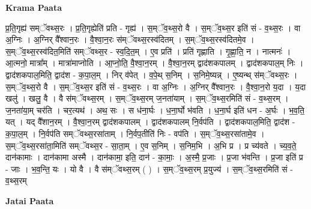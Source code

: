 \documentclass[17pt]{extarticle}
\begin{document}
\textbf{Krama Paata} \newline

प्र॒ति॒गृह्य॑ सम्ॅवथ्स॒रः । प्र॒ति॒गृह्येति॑ प्रति - गृह्य॑ । स॒म्ॅव॒थ्स॒रो वै । स॒म्ॅव॒थ्स॒र इति॑ सं - व॒थ्स॒रः । वा अ॒ग्निः । अ॒ग्निर् वै᳚श्वान॒रः । वै॒श्वा॒न॒रः स॑म्ॅवथ्स॒रस्व॑दितम् । स॒म्ॅव॒थ्स॒रस्व॑दितमे॒व । स॒म्ॅव॒थ्स॒रस्व॑दित॒मिति॑ सम्ॅवथ्स॒र - स्व॒दि॒त॒म् । ए॒व प्रति॑ । प्रति॑ गृह्णाति । गृ॒ह्णा॒ति॒ न । नात्मनः॑ । आ॒त्मनो॒ मात्रा᳚म् । मात्रा॑माप्नोति । आ॒प्नो॒ति॒ वै॒श्वा॒न॒रम् । वै॒श्वा॒न॒रम् द्वाद॑शकपालम् । द्वाद॑शकपाल॒म् निः । द्वाद॑शकपाल॒मिति॒ द्वाद॑श - क॒पा॒ल॒म् । निर् व॑पेत् । व॒पे॒थ् स॒निम् । स॒निमे॒ष्यन्न् । ए॒ष्यन्थ् स॑म्ॅवथ्स॒रः । स॒म्ॅव॒थ्स॒रो वै । स॒म्ॅव॒थ्स॒र इति॑ सं - व॒थ्स॒रः । वा अ॒ग्निः । अ॒ग्निर् वै᳚श्वान॒रः । वै॒श्वा॒न॒रो य॒दा । य॒दा खलु॑ । खलु॒ वै । वै स॑म्ॅवथ्स॒रम् । स॒म्ॅव॒थ्स॒रम् ज॒नता॑याम् । स॒म्ॅव॒थ्स॒रमिति॑ सं - व॒थ्स॒रम् । ज॒नता॑या॒म् चर॑ति । चर॒त्यथ॑ । अथ॒ सः । स ध॑ना॒र्घः । ध॒ना॒र्घो भ॑वति । ध॒ना॒र्घ इति॑ धन - अ॒र्घः । भ॒व॒ति॒ यत् । यद् वै᳚शान॒रम् । वै॒श्वा॒न॒रम् द्वाद॑शकपालम् । द्वाद॑शकपालम् नि॒र्वप॑ति । द्वाद॑शकपाल॒मिति॒ द्वाद॑श - क॒पा॒ल॒म् । नि॒र्वप॑ति सम्ॅवथ्स॒रसा॑ताम् । नि॒र्वप॒तीति॑ निः - वप॑ति । स॒म्ॅव॒थ्स॒रसा॑तामे॒व । स॒म्ॅव॒थ्स॒रसा॑ता॒मिति॑ सम्ॅवथ्स॒र - सा॒ता॒म् । ए॒व स॒निम् । स॒निम॒भि । अ॒भि प्र । प्र च्य॑वते । च्य॒व॒ते॒ दान॑कामाः । दान॑कामा अस्मै । दान॑कामा॒ इति॒ दान॑ - का॒माः॒ । अ॒स्मै॒ प्र॒जाः । प्र॒जा भ॑वन्ति । प्र॒जा इति॑ प्र - जाः । भ॒व॒न्ति॒ यः । यो वै । वै स॑म्ॅवथ्स॒रम् ( ) । स॒म्ॅव॒थ्स॒रम् प्र॒युज्य॑ । स॒म्ॅव॒थ्स॒रमिति॑ सं - व॒थ्स॒रम् \newline

\textbf{Jatai Paata} \newline
\end{document}
